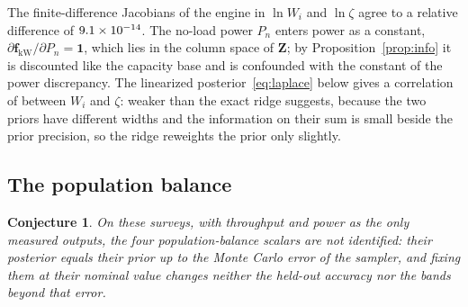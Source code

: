 \documentclass[journal]{IEEEtran}
\newtheorem{conjecture}{Conjecture}
\begin{document}
The finite-difference Jacobians of the engine in $\ln W_i$ and $\ln\zeta$ agree to a relative difference of $9.1\times 10^{-14}$. The
no-load power $P_n$ enters power as a constant, $\partial\mathbf f_{\mathrm{kW}}/\partial P_n=\mathbf 1$, which lies in the
column space of $\mathbf Z$; by Proposition~\ref{prop:info} it is discounted like the capacity base and is confounded with the
constant of the power discrepancy. The linearized posterior~\eqref{eq:laplace} below gives a correlation of \thCorrWz{}
between $W_i$ and $\zeta$: weaker than the exact ridge suggests, because the two priors have different widths and the
information on their sum is small beside the prior precision, so the ridge reweights the prior only slightly.

\subsection{The population balance}

\begin{conjecture}\label{conj:pb}
On these surveys, with throughput and power as the only measured outputs, the four population-balance scalars are not
identified: their posterior equals their prior up to the Monte Carlo error of the sampler, and fixing them at their
nominal value changes neither the held-out accuracy nor the bands beyond that error.
\end{conjecture}
\end{document}

